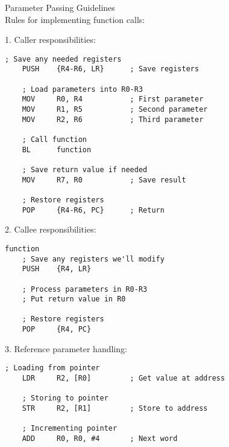 \begin{KR}{Parameter Passing Guidelines}\\
Rules for implementing function calls:

1. Caller responsibilities:
\begin{lstlisting}[language=armasm, style=basesmol]
    ; Save any needed registers
    PUSH    {R4-R6, LR}      ; Save registers
    
    ; Load parameters into R0-R3
    MOV     R0, R4           ; First parameter
    MOV     R1, R5           ; Second parameter
    MOV     R2, R6           ; Third parameter
    
    ; Call function
    BL      function
    
    ; Save return value if needed
    MOV     R7, R0           ; Save result
    
    ; Restore registers
    POP     {R4-R6, PC}      ; Return
\end{lstlisting}

2. Callee responsibilities:
\begin{lstlisting}[language=armasm, style=basesmol]
function
    ; Save any registers we'll modify
    PUSH    {R4, LR}
    
    ; Process parameters in R0-R3
    ; Put return value in R0
    
    ; Restore registers
    POP     {R4, PC}
\end{lstlisting}

3. Reference parameter handling:
\begin{lstlisting}[language=armasm, style=basesmol]
    ; Loading from pointer
    LDR     R2, [R0]         ; Get value at address
    
    ; Storing to pointer
    STR     R2, [R1]         ; Store to address
    
    ; Incrementing pointer
    ADD     R0, R0, #4       ; Next word
\end{lstlisting}
\end{KR}

